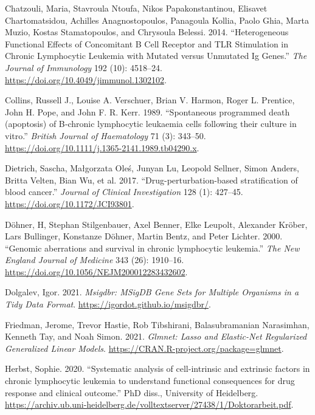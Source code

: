 \documentclass[11pt, a4paper, twosided]{book}
\newenvironment{CSLReferences}%
  {}%
  {\par}
\begin{document}
\begin{CSLReferences}{1}{0}
\leavevmode{}%
Chatzouli, Maria, Stavroula Ntoufa, Nikos Papakonstantinou, Elisavet Chartomatsidou, Achilles Anagnostopoulos, Panagoula Kollia, Paolo Ghia, Marta Muzio, Kostas Stamatopoulos, and Chrysoula Belessi. 2014. {``{Heterogeneous Functional Effects of Concomitant B Cell Receptor and TLR Stimulation in Chronic Lymphocytic Leukemia with Mutated versus Unmutated Ig Genes}.''} \emph{The Journal of Immunology} 192 (10): 4518--24. \url{https://doi.org/10.4049/jimmunol.1302102}.

\leavevmode{}%
Collins, Russell J., Louise A. Verschuer, Brian V. Harmon, Roger L. Prentice, John H. Pope, and John F. R. Kerr. 1989. {``{Spontaneous programmed death (apoptosis) of B‐chronic lymphocytic leukaemia cells following their culture in vitro}.''} \emph{British Journal of Haematology} 71 (3): 343--50. \url{https://doi.org/10.1111/j.1365-2141.1989.tb04290.x}.

\leavevmode{}%
Dietrich, Sascha, Małgorzata Oleś, Junyan Lu, Leopold Sellner, Simon Anders, Britta Velten, Bian Wu, et al. 2017. {``{Drug-perturbation-based stratification of blood cancer}.''} \emph{Journal of Clinical Investigation} 128 (1): 427--45. \url{https://doi.org/10.1172/JCI93801}.

\leavevmode{}%
Döhner, H, Stephan Stilgenbauer, Axel Benner, Elke Leupolt, Alexander Kröber, Lars Bullinger, Konstanze Döhner, Martin Bentz, and Peter Lichter. 2000. {``{Genomic aberrations and survival in chronic lymphocytic leukemia.}''} \emph{The New England Journal of Medicine} 343 (26): 1910--16. \url{https://doi.org/10.1056/NEJM200012283432602}.

\leavevmode{}%
Dolgalev, Igor. 2021. \emph{Msigdbr: MSigDB Gene Sets for Multiple Organisms in a Tidy Data Format}. \url{https://igordot.github.io/msigdbr/}.

\leavevmode{}%
Friedman, Jerome, Trevor Hastie, Rob Tibshirani, Balasubramanian Narasimhan, Kenneth Tay, and Noah Simon. 2021. \emph{Glmnet: Lasso and Elastic-Net Regularized Generalized Linear Models}. \url{https://CRAN.R-project.org/package=glmnet}.

\leavevmode{}%
Herbst, Sophie. 2020. {``{Systematic analysis of cell-intrinsic and extrinsic factors in chronic lymphocytic leukemia to understand functional consequences for drug response and clinical outcome}.''} PhD diss., University of Heidelberg. \url{https://archiv.ub.uni-heidelberg.de/volltextserver/27438/1/Doktorarbeit.pdf}.


\end{CSLReferences}
\end{document}
